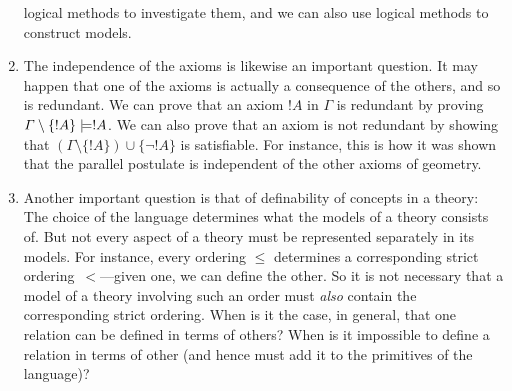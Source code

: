\documentclass[../../include/open-logic-section]{subfiles}
\begin{document}
\begin{explain}
\begin{enumerate}
  logical methods to investigate them, and we can also use logical
  methods to construct models.
\item The independence of the axioms is likewise an important
  question.  It may happen that one of the axioms is actually a
  consequence of the others, and so is redundant.  We can prove that
  an axiom $!A$ in $\Gamma$ is redundant by proving $\Gamma \setminus
  \{!A\} \Entails !A$.  We can also prove that an axiom is not
  redundant by showing that $(\Gamma \setminus \{!A\}) \cup \{\lnot
  !A\}$ is satisfiable.  For instance, this is how it was shown that the
  parallel postulate is independent of the other axioms of geometry.
\item Another important question is that of definability of concepts
  in a theory: The choice of the language determines what the models
  of a theory consists of.  But not every aspect of a theory must be
  represented separately in its models.  For instance, every ordering
  $\le$ determines a corresponding strict ordering~$<$---given one, we
  can define the other.  So it is not necessary that a model of a
  theory involving such an order must \emph{also} contain the
  corresponding strict ordering.  When is it the case, in general,
  that one relation can be defined in terms of others?  When is it
  impossible to define a relation in terms of other (and hence must
  add it to the primitives of the language)?
\end{enumerate}
\end{explain}
\end{document}
